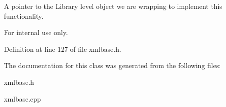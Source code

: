 A pointer to the Library level object we are wrapping to implement this functionality. 

\begin{DoxyInternal}{For internal use only.}
\end{DoxyInternal}


Definition at line 127 of file xmlbase.h.



The documentation for this class was generated from the following files:\begin{DoxyCompactItemize}
\item 
xmlbase.h\item 
xmlbase.cpp\end{DoxyCompactItemize}
